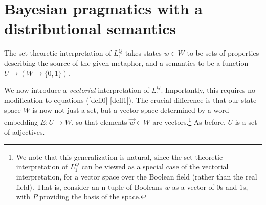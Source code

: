 \documentclass[OpenMind]{stjour}
\newcommand{\Listener}{L}
\newcommand{\QLONE}{\Listener_{{1}}^{{Q}}}
\begin{document}



\section{Bayesian pragmatics with a distributional semantics} \label{bayesdist}

	The set-theoretic interpretation of $\QLONE$ takes states $w \in W$ to be sets of properties describing the source of the given metaphor, and a semantics to be a function $U\to(W\to\{0, 1\})$.

	We now introduce a \emph{vectorial} interpretation of $\QLONE$. Importantly, this requires no modification to equations (\ref{defl0}-\ref{defl1}). The crucial difference is that our state space $W$ is now not just a set, but a vector space determined by a word embedding $E : U\to W$, so that elements $\overrightarrow{w}\in W$ are vectors.\footnote{We note that this generalization is natural, since the set-theoretic interpretation of $\QLONE$ can be viewed as a special case of the vectorial interpretation, for a vector space over the Boolean field (rather than the real field). That is, consider an n-tuple of Booleans $w$ as a vector of $0$s and $1$s, with $P$ providing the basis of the space.} As before, $U$ is a set of adjectives. 
\end{document}
